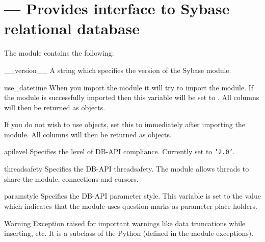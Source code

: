 \section{ --- Provides interface to Sybase relational database}



The  module contains the following:

\begin{datadesc}{__version__}
A string which specifies the version of the Sybase module.
\end{datadesc}

\begin{datadesc}{use_datetime}
When you import the  module it will try to import the
 module.  If the  module is
successfully imported then this variable will be set to .  All
 columns will then be returned as
 objects.

If you do not wish to use  objects, set
this to  immediately after importing the 
module.  All  columns will then be returned as
 objects.
\end{datadesc}

\begin{datadesc}{apilevel}
Specifies the level of DB-API compliance.  Currently set to
\texttt{'2.0'}.
\end{datadesc}

\begin{datadesc}{threadsafety}
Specifies the DB-API threadsafety.  The  module allows
threads to share the module, connections and cursors.
\end{datadesc}

\begin{datadesc}{paramstyle}
Specifies the DB-API parameter style.  This variable is set to the
value  which indicates that the  module
uses question marks as parameter place holders.
\end{datadesc}

\begin{excdesc}{Warning}
Exception raised for important warnings like data truncations while
inserting, etc.  It is a subclass of the Python 
(defined in the module exceptions).
\end{excdesc}

